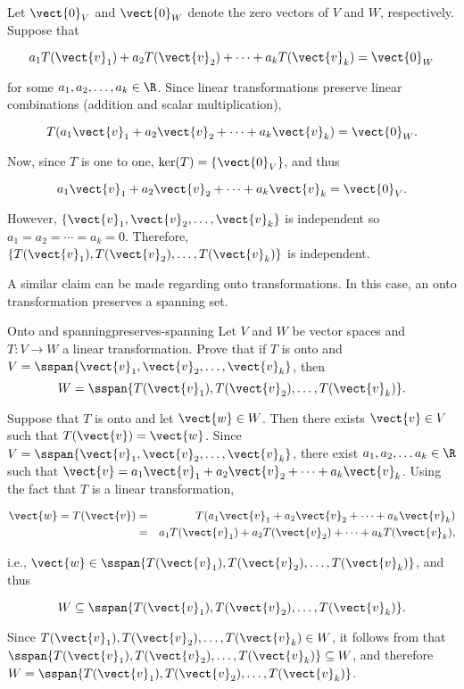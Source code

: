 \begin{solution}
Let $\vect{0}_V$ and $\vect{0}_W$ denote the zero vectors of $V$ and $W$,
respectively.
Suppose that 

\[ a_1T(\vect{v}_1) + a_2T(\vect{v}_2) +\cdots +a_kT(\vect{v}_k) =\vect{0}_W \]

for some $a_1, a_2, \ldots, a_k\in\R$.
Since linear transformations preserve linear combinations (addition
and scalar multiplication),

\[ T(a_1\vect{v}_1 + a_2\vect{v}_2 +\cdots +a_k\vect{v}_k) =\vect{0}_W. \]

Now, since $T$ is one to one, $\ker(T)=\{\vect{0}_V\}$, and thus

\[ a_1\vect{v}_1 + a_2\vect{v}_2 +\cdots +a_k\vect{v}_k =\vect{0}_V. \]

\noindent However, $\{\vect{v}_1, \vect{v}_2, \ldots, \vect{v}_k\}$ is independent so $a_1=a_2=\cdots=a_k=0$.
Therefore, $\{T(\vect{v}_1), T(\vect{v}_2), \ldots, T(\vect{v}_k)\}$
is independent.
\end{solution}

A similar claim can be made regarding onto transformations. In this case, an onto transformation preserves a spanning set.

\begin{example}{Onto and spanning}{preserves-spanning}
Let $V$ and $W$ be vector spaces and $T:V\to W$ a linear
transformation.
Prove that if $T$ is onto and
$V=\sspan\{\vect{v}_1, \vect{v}_2, \ldots, \vect{v}_k\}$,
then
\[ W=\sspan\{T(\vect{v}_1), T(\vect{v}_2), \ldots, T(\vect{v}_k)\}.\]
\end{example}

\begin{solution}
Suppose that $T$ is onto and let $\vect{w}\in W$.  
Then there exists $\vect{v}\in V$ such that $T(\vect{v})=\vect{w}$.
Since $V=\sspan\{\vect{v}_1, \vect{v}_2, \ldots, \vect{v}_k\}$, there
exist $a_1, a_2, \ldots a_k\in\R$ such that 
$\vect{v} = a_1\vect{v}_1 + a_2\vect{v}_2 + \cdots + a_k\vect{v}_k$.
Using the fact that $T$ is a linear transformation,

\begin{eqnarray*}
\vect{w}=T(\vect{v})
& = & T(a_1\vect{v}_1 + a_2\vect{v}_2 + \cdots + a_k\vect{v}_k) \\
& = & a_1T(\vect{v}_1) + a_2T(\vect{v}_2) + \cdots + a_kT(\vect{v}_k),
\end{eqnarray*}

i.e., $\vect{w}\in\sspan\{T(\vect{v}_1), T(\vect{v}_2), \ldots, T(\vect{v}_k)\}$,
and thus 

\[ W\subseteq \sspan\{T(\vect{v}_1), T(\vect{v}_2), \ldots, T(\vect{v}_k)\}.\]

Since $T(\vect{v}_1), T(\vect{v}_2), \ldots, T(\vect{v}_k)\in W$, 
it follows from
that
$\sspan\{T(\vect{v}_1), T(\vect{v}_2), \ldots, T(\vect{v}_k)\}\subseteq W$,
and therefore
$W=\sspan\{T(\vect{v}_1), T(\vect{v}_2), \ldots, T(\vect{v}_k)\}$.
\end{solution}
